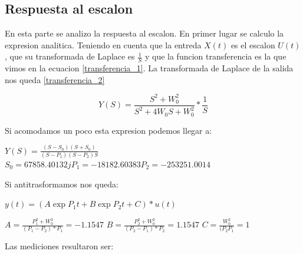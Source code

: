 \documentclass[12pt,a4paper]{article}
\begin{document}
\subsection{Respuesta al escalon}
En esta parte se analizo la respuesta al escalon. En primer lugar se calculo la expresion analitica. Teniendo en cuenta que 
la entreda $X(t)$ es el escalon $U(t)$, que su transformada de Laplace es $\frac{1}{S}$ y que la funcion transferencia es la que 
vimos en la ecuacion \ref{transferencia_1}. La transformada de Laplace de la salida nos queda \ref{transferencia_2}


\begin{equation} Y(S) = \frac{S^2+W_{0}^2}{S^2+4W_{0}S+W_{0}^2} * \frac{1}{S}  \label{transferencia_2}\end{equation}

Si acomodamos un poco esta expresion podemos llegar a: \\

\begin{center}
    $Y(S) = \frac{(S-S_{0})(S+S_{0})}{(S-P_{1})(S-P_{2})S}$  \\
    
    $S_{0}=67858.40132j
    P_{1}=-18182.60383
    P_{2}=-253251.0014$
    \end{center}

Si antitrasformamos nos queda:\\

\begin{center}
    $y(t) = (A\exp{P_{1}t}+B\exp{P_{2}t}+C) * u(t)$

    $A = \frac{P_{1}^2 + W_{0}^2}{(P_{1}-P_{2})*P_{1}} = -1.1547$
    $B = \frac{P_{2}^2 + W_{0}^2}{(P_{2}-P_{1})*P_{2}} =  1.1547$
    $C = \frac{W_{0}^2}{(P_{2}P_{1}} = 1$

    \end{center}



Las mediciones resultaron ser:
\end{document}
